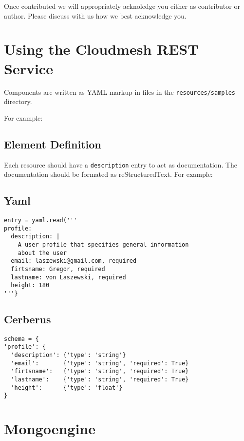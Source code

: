\documentclass[9pt,twocolumn,twoside]{styles/osajnl}
\begin{document}
Once contributed we will appropriately acknoledge you either as
contributor or author. Please discuss with us how we best acknowledge
you.

\section{Using the Cloudmesh REST Service} 

Components are written as YAML markup in files in the
\verb+resources/samples+ directory.

For example:


\subsection{Element Definition}

Each resource should have a \verb+description+ entry to act as
documentation. The documentation should be formated as
reStructuredText. For example:

\subsection{Yaml}

\begin{Verbatim}
entry = yaml.read('''
profile:
  description: |
    A user profile that specifies general information 
    about the user
  email: laszewski@gmail.com, required
  firtsname: Gregor, required
  lastname: von Laszewski, required
  height: 180
'''}
\end{Verbatim}

\subsection{Cerberus}

\begin{Verbatim}
schema = {
'profile': {
  'description': {'type': 'string'}
  'email':       {'type': 'string', 'required': True}
  'firtsname':   {'type': 'string', 'required': True}
  'lastname':    {'type': 'string', 'required': True}
  'height':      {'type': 'float'}
}
\end{Verbatim}

\section{Mongoengine}
\end{document}
